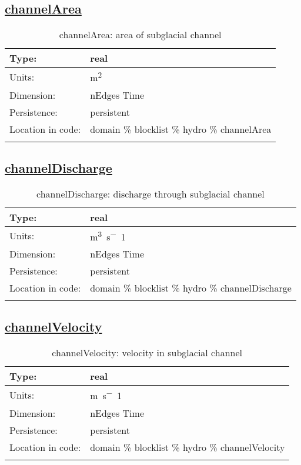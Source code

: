 \subsection[channelArea]{\hyperref[sec:var_tab_hydro]{channelArea}}
\label{subsec:var_sec_hydro_channelArea}
\begin{center}
\begin{longtable}{| p{2.0in} | p{4.0in} |}
        \hline 
        Type: & real \\
        \hline 
        Units: & \si{m^2} \\
        \hline 
        Dimension: & nEdges Time \\
        \hline 
        Persistence: & persistent \\
        \hline 
         Location in code: & domain \% blocklist \% hydro \% channelArea \\
         \hline 
    \caption{channelArea: area of subglacial channel}
\end{longtable}
\end{center}
\subsection[channelDischarge]{\hyperref[sec:var_tab_hydro]{channelDischarge}}
\label{subsec:var_sec_hydro_channelDischarge}
\begin{center}
\begin{longtable}{| p{2.0in} | p{4.0in} |}
        \hline 
        Type: & real \\
        \hline 
        Units: & \si{m^3.s^-1} \\
        \hline 
        Dimension: & nEdges Time \\
        \hline 
        Persistence: & persistent \\
        \hline 
         Location in code: & domain \% blocklist \% hydro \% channelDischarge \\
         \hline 
    \caption{channelDischarge: discharge through subglacial channel}
\end{longtable}
\end{center}
\subsection[channelVelocity]{\hyperref[sec:var_tab_hydro]{channelVelocity}}
\label{subsec:var_sec_hydro_channelVelocity}
\begin{center}
\begin{longtable}{| p{2.0in} | p{4.0in} |}
        \hline 
        Type: & real \\
        \hline 
        Units: & \si{m.s^-1} \\
        \hline 
        Dimension: & nEdges Time \\
        \hline 
        Persistence: & persistent \\
        \hline 
         Location in code: & domain \% blocklist \% hydro \% channelVelocity \\
         \hline 
    \caption{channelVelocity: velocity in subglacial channel}
\end{longtable}
\end{center}

